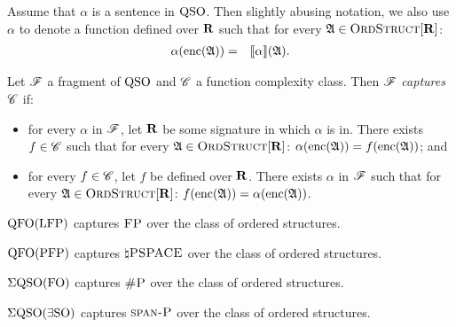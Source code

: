 

Assume that $\alpha$ is a sentence in ${\rm QSO}$. Then slightly abusing notation, we also use $\alpha$ to denote a function defined over $\mathbf{R}$  such that for every $\mathfrak{A} \in \text{\sc OrdStruct}[\mathbf{R}] $:
\begin{eqnarray*}
	\alpha({\rm enc}(\mathfrak{A})) & = & {\llbracket{}{\alpha}\rrbracket}(\mathfrak{A}).
\end{eqnarray*}
\begin{definition}
	Let $\mathscr{F}$ a fragment of ${\rm QSO}$ and $\mathscr{C}$ a function complexity class. Then $\mathscr{F}$ {\em captures} $\mathscr{C}$ if:
	\begin{itemize}
		\item for every $\alpha$ in $\mathscr{F}$, let $\mathbf{R}$ be some signature in which $\alpha$ is in. There exists $f \in \mathscr{C}$ such that for every 
		$\mathfrak{A} \in \text{\sc OrdStruct}[\mathbf{R}]$:  $\alpha({\rm enc}(\mathfrak{A})) = f({\rm enc}(\mathfrak{A}))$; and
		
		\item for every $f \in \mathscr{C}$, let $f$ be defined over $\mathbf{R}$. There exists $\alpha$ in $\mathscr{F}$ such that for every 
		$\mathfrak{A} \in \text{\sc OrdStruct}[\mathbf{R}]$:  $f({\rm enc}(\mathfrak{A})) = \alpha({\rm enc}(\mathfrak{A}))$.
	\end{itemize}
\end{definition}

\begin{theorem} \label{captfp}
	${\rm QFO}({\rm LFP})$ captures $\text{\sc FP}$ over the class of ordered structures.
\end{theorem}

\begin{theorem} \label{qfo-pfp-cap}
	${\rm QFO}({\rm PFP})$ captures $\natural\text{\sc PSPACE}$ over the class of ordered structures.
\end{theorem}

\begin{theorem} \label{eqso-fo-cap}
	$\Sigma{\rm QSO}({\rm FO})$ captures $\text{\sc \#P}$ over the class of ordered structures.
\end{theorem}

\begin{theorem} \label{eqso-eso-cap}
	$\Sigma{\rm QSO}(\exists{\rm SO})$ captures $\text{\sc span-P}$ over the class of ordered structures.
\end{theorem}
